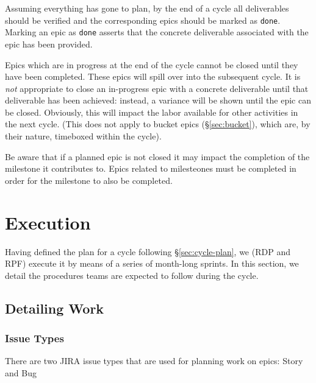 Assuming everything has gone to plan, by the end of a \gls{cycle} all deliverables should be verified and the corresponding \glspl{epic} should be marked as \texttt{done}.
Marking an \gls{epic} as \texttt{done} asserts that the concrete deliverable associated with the \gls{epic} has been provided.

Epics which are in progress at the end of the \gls{cycle} cannot be closed until they have been completed.
These \glspl{epic} will spill over into the subsequent \gls{cycle}.
It is \emph{not} appropriate to close an in-progress \gls{epic} with a concrete deliverable until that deliverable has been achieved: instead, a variance will be shown until the \gls{epic} can be closed.
Obviously, this will impact the labor available for other activities in the next \gls{cycle}.
(This does not apply to bucket \glspl{epic} (\S\ref{sec:bucket}), which are, by their nature, \gls{timebox}ed within the \gls{cycle}).

Be aware that if a planned epic is not closed it may impact the completion of the milestone it contributes to.  Epics related to milesteones must be completed in order for the milestone to also be completed.

\section{Execution} \label{sec:execution}

Having defined the plan for a \gls{cycle} following \S\ref{sec:cycle-plan}, we (RDP and RPF) execute it by means of a series of month-long sprints.
In this section, we detail the procedures teams are expected to follow during the \gls{cycle}.

\subsection{Detailing Work}
\label{sec:detailing-work}

\subsubsection{Issue Types}\label{issue-types}

There are two \gls{JIRA} issue types that are used for planning work on epics: Story and Bug

